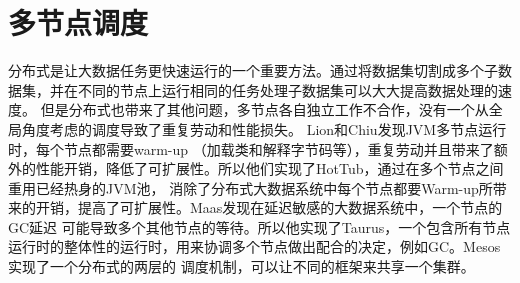 \section{多节点调度}
分布式是让大数据任务更快速运行的一个重要方法。通过将数据集切割成多个子数据集，并在不同的节点上运行相同的任务处理子数据集可以大大提高数据处理的速度。
但是分布式也带来了其他问题，多节点各自独立工作不合作，没有一个从全局角度考虑的调度导致了重复劳动和性能损失\cite{ahmad2012tarazu, ananthanarayanan2010reining, isard2009quincy, ousterhout2013sparrow, zaharia2008improving}。
Lion和Chiu\cite{lion2016don}发现JVM多节点运行时，每个节点都需要warm-up
（加载类和解释字节码等），重复劳动并且带来了额外的性能开销，降低了可扩展性。所以他们实现了HotTub，通过在多个节点之间重用已经热身的JVM池，
消除了分布式大数据系统中每个节点都要Warm-up所带来的开销，提高了可扩展性。Maas\cite{maas2016taurus, maas2015trash}发现在延迟敏感的大数据系统中，一个节点的GC延迟
可能导致多个其他节点的等待。所以他实现了Taurus，一个包含所有节点运行时的整体性的运行时，用来协调多个节点做出配合的决定，例如GC。Mesos\cite{hindman2011mesos}实现了一个分布式的两层的
调度机制，可以让不同的框架来共享一个集群。










